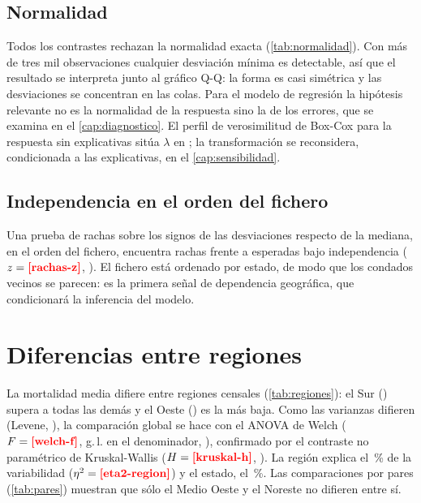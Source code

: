 \subsection{Normalidad}

Todos los contrastes rechazan la normalidad exacta (\cref{tab:normalidad}). Con más de tres mil
observaciones cualquier desviación mínima es detectable, así que el resultado se interpreta
junto al gráfico Q-Q: la forma es casi simétrica y las desviaciones se concentran en las colas.
Para el modelo de regresión la hipótesis relevante no es la normalidad de la respuesta sino la de
los errores, que se examina en el \cref{cap:diagnostico}. El perfil de verosimilitud de Box-Cox
\parencite{boxcox1964} para la respuesta sin explicativas sitúa $\lambda$ en 
; la transformación se reconsidera, condicionada a las explicativas, en el
\cref{cap:sensibilidad}.



\subsection{Independencia en el orden del fichero}

Una prueba de rachas sobre los signos de las desviaciones respecto de la mediana, en el orden del
fichero, encuentra  rachas frente a  esperadas bajo
independencia ($z=\res{rachas-z}$, ). El fichero está ordenado por estado, de modo
que los condados vecinos se parecen: es la primera señal de dependencia geográfica, que
condicionará la inferencia del modelo.

\section{Diferencias entre regiones}

La mortalidad media difiere entre regiones censales (\cref{tab:regiones}): el Sur
() supera a todas las demás y el Oeste () es la más baja. Como las
varianzas difieren (Levene, ), la comparación global se hace con el ANOVA de Welch
($F=\res{welch-f}$,  g.\,l. en el denominador, ), confirmado por el
contraste no paramétrico de Kruskal-Wallis ($H=\res{kruskal-h}$, ). La región
explica el \,\% de la variabilidad ($\eta^2=\res{eta2-region}$) y el estado, el
\,\%. Las comparaciones por pares (\cref{tab:pares}) muestran que sólo el Medio
Oeste y el Noreste no difieren entre sí.

